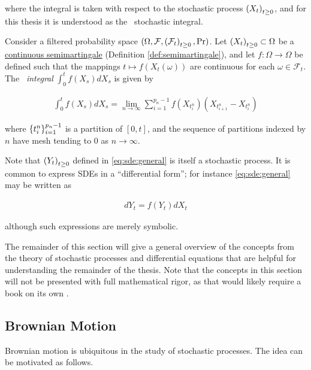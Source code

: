 where the integral is taken with respect to the stochastic process
$\indexedabove{t}{X}$, and for this thesis it is understood as the
\Ito\ stochastic integral.

\begin{definition}
  Consider a filtered probability space $(\Omega, \mathcal{F},
  \indexedabove{t}{\mathcal{F}}, \Pr)$. Let
  $\indexedabove{t}{X}\subset\Omega$ be a
  \hyperref[def:semimartingale]{continuous semimartingale} (Definition
  \ref{def:semimartingale}), and let $f:\Omega\to\Omega$ be defined such that the
  mappings $t\mapsto f(X_t(\omega))$ are continuous for each
  $\omega\in\mathcal{F}_t$. The \emph{\Ito\ integral}
  $\int_0^tf(X_s)dX_s$ is given by

  \begin{align*}
    \int_0^tf(X_s)dX_s = \lim_{n\to\infty}\sum_{i=1}^{p_n - 1}f(X_{t_i^n})(X_{t_{i+1}^n}-X_{t^n_i})
  \end{align*}

  where $\indexedint{i}{p_n-1}{t^n}$ is a partition of $[0,t]$, and
  the sequence of partitions indexed by $n$ have mesh tending to $0$
  as $n\to\infty$.
\end{definition}

Note that $\indexedabove{t}{Y}$ defined in
\eqref{eq:sde:general} is itself a stochastic process. It is common to
express SDEs in a ``differential form''; for instance
\eqref{eq:sde:general} may be written as

\begin{align*}
  dY_t = f(Y_t)dX_t
\end{align*}

although such expressions are merely symbolic.

The remainder of this section will give a general overview of the
concepts from the theory of stochastic processes and differential
equations that are helpful for understanding the remainder of the
thesis. Note that the concepts in this section will not be presented
with full mathematical rigor, as that would likely require a book on
its own \citep{le2016brownian}.

\subsection{Brownian Motion}
Brownian motion is ubiquitous in the study of stochastic
processes. The idea can be motivated as follows.

